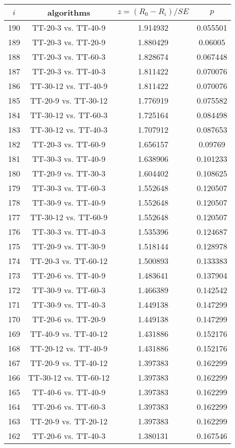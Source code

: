 \documentclass[a4paper,10pt]{article}
\begin{document}
\begin{landscape}
\begin{table}[!htp]
\centering\scriptsize
\begin{tabular}{cccc}
$i$&algorithms&$z=(R_0 - R_i)/SE$&$p$\\
\hline190&TT-20-3 vs. TT-40-9&1.914932&0.055501\\
189&TT-20-3 vs. TT-20-9&1.880429&0.06005\\
188&TT-20-3 vs. TT-60-3&1.828674&0.067448\\
187&TT-20-3 vs. TT-40-3&1.811422&0.070076\\
186&TT-30-12 vs. TT-40-9&1.811422&0.070076\\
185&TT-20-9 vs. TT-30-12&1.776919&0.075582\\
184&TT-30-12 vs. TT-60-3&1.725164&0.084498\\
183&TT-30-12 vs. TT-40-3&1.707912&0.087653\\
182&TT-20-3 vs. TT-60-9&1.656157&0.09769\\
181&TT-30-3 vs. TT-40-9&1.638906&0.101233\\
180&TT-20-9 vs. TT-30-3&1.604402&0.108625\\
179&TT-30-3 vs. TT-60-3&1.552648&0.120507\\
178&TT-30-9 vs. TT-40-9&1.552648&0.120507\\
177&TT-30-12 vs. TT-60-9&1.552648&0.120507\\
176&TT-30-3 vs. TT-40-3&1.535396&0.124687\\
175&TT-20-9 vs. TT-30-9&1.518144&0.128978\\
174&TT-20-3 vs. TT-60-12&1.500893&0.133383\\
173&TT-20-6 vs. TT-40-9&1.483641&0.137904\\
172&TT-30-9 vs. TT-60-3&1.466389&0.142542\\
171&TT-30-9 vs. TT-40-3&1.449138&0.147299\\
170&TT-20-6 vs. TT-20-9&1.449138&0.147299\\
169&TT-40-9 vs. TT-40-12&1.431886&0.152176\\
168&TT-20-12 vs. TT-40-9&1.431886&0.152176\\
167&TT-20-9 vs. TT-40-12&1.397383&0.162299\\
166&TT-30-12 vs. TT-60-12&1.397383&0.162299\\
165&TT-40-6 vs. TT-40-9&1.397383&0.162299\\
164&TT-20-6 vs. TT-60-3&1.397383&0.162299\\
163&TT-20-9 vs. TT-20-12&1.397383&0.162299\\
162&TT-20-6 vs. TT-40-3&1.380131&0.167546\\

\end{tabular}
\end{table}
\end{landscape}
\end{document}
